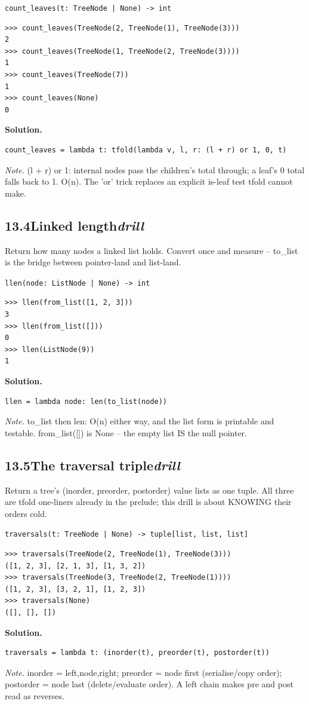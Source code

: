 \documentclass[10pt,letterpaper]{book}
\begin{document}
\noindent\texttt{count\_leaves(t: TreeNode | None) -> int}
\begin{lstlisting}[style=ex]
>>> count_leaves(TreeNode(2, TreeNode(1), TreeNode(3)))
2
>>> count_leaves(TreeNode(1, TreeNode(2, TreeNode(3))))
1
>>> count_leaves(TreeNode(7))
1
>>> count_leaves(None)
0
\end{lstlisting}
\noindent\textbf{Solution.}
\begin{lstlisting}[style=code]
count_leaves = lambda t: tfold(lambda v, l, r: (l + r) or 1, 0, t)
\end{lstlisting}
\noindent\textit{Note.} (l + r) or 1: internal nodes pass the children's total through; a leaf's 0 total falls back to 1. O(n). The 'or' trick replaces an explicit is-leaf test tfold cannot make.

\subsection*{13.4\quad Linked length\hfill\textnormal{\textit{drill}}}
Return how many nodes a linked list holds. Convert once and measure -- to\_list is the bridge between pointer-land and list-land.

\noindent\texttt{llen(node: ListNode | None) -> int}
\begin{lstlisting}[style=ex]
>>> llen(from_list([1, 2, 3]))
3
>>> llen(from_list([]))
0
>>> llen(ListNode(9))
1
\end{lstlisting}
\noindent\textbf{Solution.}
\begin{lstlisting}[style=code]
llen = lambda node: len(to_list(node))
\end{lstlisting}
\noindent\textit{Note.} to\_list then len: O(n) either way, and the list form is printable and testable. from\_list([]) is None -- the empty list IS the null pointer.

\subsection*{13.5\quad The traversal triple\hfill\textnormal{\textit{drill}}}
Return a tree's (inorder, preorder, postorder) value lists as one tuple. All three are tfold one-liners already in the prelude; this drill is about KNOWING their orders cold.

\noindent\texttt{traversals(t: TreeNode | None) -> tuple[list, list, list]}
\begin{lstlisting}[style=ex]
>>> traversals(TreeNode(2, TreeNode(1), TreeNode(3)))
([1, 2, 3], [2, 1, 3], [1, 3, 2])
>>> traversals(TreeNode(3, TreeNode(2, TreeNode(1))))
([1, 2, 3], [3, 2, 1], [1, 2, 3])
>>> traversals(None)
([], [], [])
\end{lstlisting}
\noindent\textbf{Solution.}
\begin{lstlisting}[style=code]
traversals = lambda t: (inorder(t), preorder(t), postorder(t))
\end{lstlisting}
\noindent\textit{Note.} inorder = left,node,right; preorder = node first (serialise/copy order); postorder = node last (delete/evaluate order). A left chain makes pre and post read as reverses.
\end{document}
